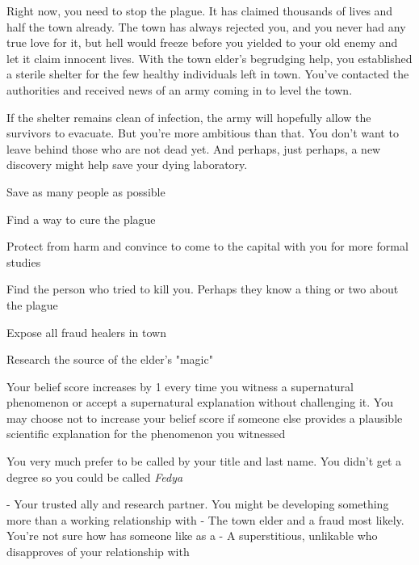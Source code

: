 \documentclass[char]{guildcamp4}
\begin{document}
Right now, you need to stop the plague. It has claimed thousands of lives and half the town already. The town has always rejected you, and you never had any true love for it, but hell would freeze before you yielded to your old enemy and let it claim innocent lives. With the town elder's begrudging help, you established a sterile shelter for the few healthy individuals left in town. You've contacted the authorities and received news of an army coming in to level the town. 

If the shelter remains clean of infection, the army will hopefully allow the survivors to evacuate. But you're more ambitious than that. You don't want to leave behind those who are not dead yet. And perhaps, just perhaps, a new discovery might help save your dying laboratory.

\begin{itemz}[Goals]
	\item Save as many people as possible
	\item Find a way to cure the plague
	\item Protect \cRebel{} from harm and convince \cRebel{\them} to come to the capital with you for more formal studies 
	\item Find the person who tried to kill you. Perhaps they know a thing or two about the plague
	\item Expose all fraud healers in town
	\item Research the source of the elder's "magic"
\end{itemz}

\begin{itemz}[Notes]
	\item Your belief score increases by 1 every time you witness a supernatural phenomenon or accept a supernatural explanation without challenging it. You may choose not to increase your belief score if someone else provides a plausible scientific explanation for the phenomenon you witnessed
	\item You very much prefer to be called by your title and last name. You didn't get a degree so you could be called \textit{Fedya}
\end{itemz}

\begin{contacts}
	\contact{\cRebel{}} - Your trusted ally and research partner. You might be developing something more than a working relationship with \cRebel{\them}
	\contact{\cElder{}} - The town elder and a fraud most likely. You're not sure how \cRebel{} has someone like \cElder{\them} as a \cElder{\parent}
	\contact{\cApprentice{}} - A superstitious, unlikable \cApprentice{\human} who disapproves of your relationship with \cRebel{}
\end{contacts}
\end{document}
